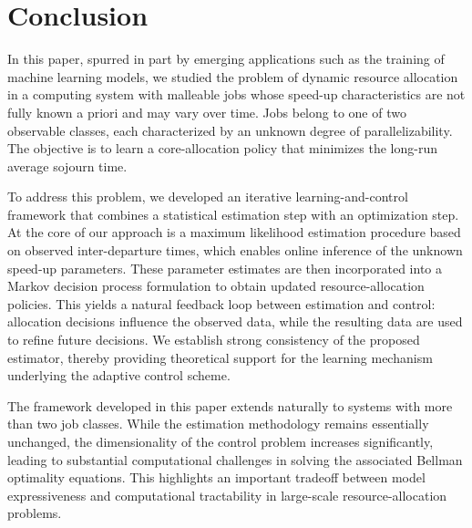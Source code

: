 \documentclass[11pt]{article}
\theoremstyle{remark}
\theoremstyle{definition}
\numberwithin{equation}{section}
\begin{document}
\section{Conclusion}\label{section: conclusion}


In this paper, spurred in part by emerging applications such as the training of machine learning models, we studied the problem of dynamic resource allocation in a computing system with malleable jobs whose speed-up characteristics are not fully known a priori and may vary over time. Jobs belong to one of two observable classes, each characterized by an unknown degree of parallelizability. The objective is to learn a core-allocation policy that minimizes the long-run average sojourn time.


To address this problem, we developed an iterative learning-and-control framework that combines a statistical estimation step with an optimization step. At the core of our approach is a maximum likelihood estimation procedure based on observed inter-departure times, which enables online inference of the unknown speed-up parameters. These parameter estimates are then incorporated into a Markov decision process formulation to obtain updated resource-allocation policies. This yields a natural feedback loop between estimation and control: allocation decisions influence the observed data, while the resulting data are used to refine future decisions. We establish strong consistency of the proposed estimator, thereby providing theoretical support for the learning mechanism underlying the adaptive control scheme.

The framework developed in this paper extends naturally to systems with more than two job classes. While the estimation methodology remains essentially unchanged, the dimensionality of the control problem increases significantly, leading to substantial computational challenges in solving the associated Bellman optimality equations. This highlights an important tradeoff between model expressiveness and computational tractability in large-scale resource-allocation problems.
\end{document}
